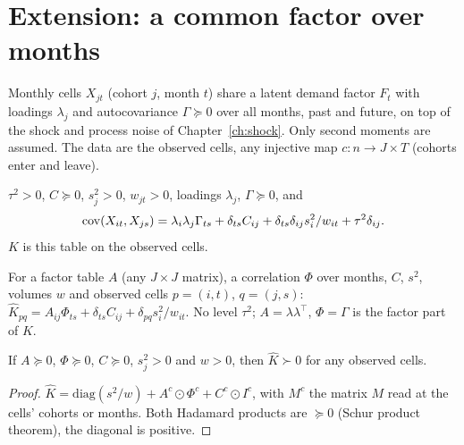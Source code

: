 \chapter{Extension: a common factor over months}\label{ch:factor}

Monthly cells $X_{jt}$ (cohort $j$, month $t$) share a latent demand factor $F_t$ with loadings
$\lambda_j$ and autocovariance $\Gamma \succeq 0$ over all months, past and future, on top of
the shock and process noise of Chapter~\ref{ch:shock}. Only second moments are assumed. The data
are the observed cells, any injective map $c : n \to J \times T$ (cohorts enter and leave).

\begin{definition}\label{def:Factor}
  \leanok
  $\tau^2 > 0$, $C \succeq 0$, $s_j^2 > 0$, $w_{jt} > 0$, loadings $\lambda_j$, $\Gamma \succeq 0$,
  and
  \[
    \operatorname{cov}(X_{it}, X_{js}) = \lambda_i\lambda_j\Gamma_{ts} + \delta_{ts}C_{ij}
      + \delta_{ts}\delta_{ij}s_i^2/w_{it} + \tau^2\delta_{ij}.
  \]
  $K$ is this table on the observed cells.
\end{definition}

\begin{definition}\label{def:Factor_tableK}
  \leanok
  For a factor table $A$ (any $J\times J$ matrix), a correlation $\Phi$ over months, $C$,
  $s^2$, volumes $w$ and observed cells $p = (i,t)$, $q = (j,s)$:
  $\hat K_{pq} = A_{ij}\Phi_{ts} + \delta_{ts}C_{ij} + \delta_{pq}s_i^2/w_{it}$. No level
  $\tau^2$; $A = \lambda\lambda^\top$, $\Phi = \Gamma$ is the factor part of $K$.
\end{definition}

\begin{theorem}\label{thm:Factor_tableK}
  \leanok
  If $A \succeq 0$, $\Phi \succeq 0$, $C \succeq 0$, $s_j^2 > 0$ and $w > 0$, then
  $\hat K \succ 0$ for any observed cells.
\end{theorem}
\begin{proof}
  \leanok
  $\hat K = \mathrm{diag}(s^2/w) + A^{c}\odot\Phi^{c} + C^{c}\odot I^{c}$, with $M^c$ the
  matrix $M$ read at the cells' cohorts or months. Both Hadamard products are $\succeq 0$
  (Schur product theorem), the diagonal is positive.
\end{proof}

